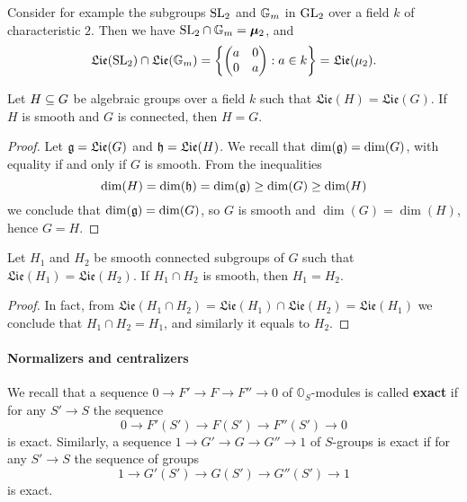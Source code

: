 \begin{example}
Consider for example the subgroups $\mathrm{SL}_2$ and $\mathbb{G}_m$ in $\mathrm{GL}_2$ over a field $k$ of characteristic $2$. Then we have $\mathrm{SL}_2\cap\mathbb{G}_m=\bm{\mu}_2$, and
\[\mathfrak{Lie}(\mathrm{SL}_2)\cap\mathfrak{Lie}(\mathbb{G}_m)=\left\{\begin{pmatrix}
a&0\\
0&a
\end{pmatrix}:a\in k\right\}=\mathfrak{Lie}(\mu_2).\]
\end{example}

\begin{proposition}\label{scheme alg group Lie algebra equal then euqal}
Let $H\subseteq G$ be algebraic groups over a field $k$ such that $\mathfrak{Lie}(H)=\mathfrak{Lie}(G)$. If $H$ is smooth and $G$ is connected, then $H=G$.
\end{proposition}
\begin{proof}
Let $\mathfrak{g}=\mathfrak{Lie}(G)$ and $\mathfrak{h}=\mathfrak{Lie}(H)$. We recall that $\dim(\mathfrak{g})=\dim(G)$, with equality if and only if $G$ is smooth. From the inequalities
\[\dim(H)=\dim(\mathfrak{h})=\dim(\mathfrak{g})\geq\dim(G)\geq\dim(H)\]
we conclude that $\dim(\mathfrak{g})=\dim(G)$, so $G$ is smooth and $\dim(G)=\dim(H)$, hence $G=H$.
\end{proof}

\begin{corollary}\label{scheme alg subgroup Lie algebra equal then equal}
Let $H_1$ and $H_2$ be smooth connected subgroups of $G$ such that $\mathfrak{Lie}(H_1)=\mathfrak{Lie}(H_2)$. If $H_1\cap H_2$ is smooth, then $H_1=H_2$.
\end{corollary}
\begin{proof}
In fact, from $\mathfrak{Lie}(H_1\cap H_2)=\mathfrak{Lie}(H_1)\cap\mathfrak{Lie}(H_2)=\mathfrak{Lie}(H_1)$ we conclude that $H_1\cap H_2=H_1$, and similarly it equals to $H_2$.
\end{proof}

\paragraph{Normalizers and centralizers}
We recall that a sequence $0\to F'\to F\to F''\to 0$ of $\mathbb{O}_S$-modules is called \textbf{exact} if for any $S'\to S$ the sequence
\[0\to F'(S')\to F(S')\to F''(S')\to 0\]
is exact. Similarly, a sequence $1\to G'\to G\to G''\to 1$ of $S$-groups is exact if for any $S'\to S$ the sequence of groups
\[1\to G'(S')\to G(S')\to G''(S')\to 1\]
is exact.

